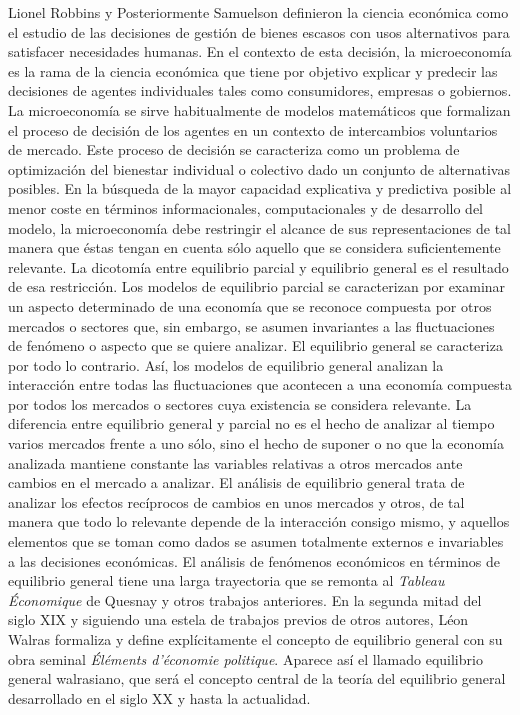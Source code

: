 \documentclass{nuevotema}
\begin{document}
\ideaclave

Lionel Robbins y Posteriormente Samuelson definieron la ciencia económica como el estudio de las decisiones de gestión de bienes escasos con usos alternativos para satisfacer necesidades humanas. En el contexto de esta decisión, la microeconomía es la rama de la ciencia económica que tiene por objetivo explicar y predecir las decisiones de agentes individuales tales como consumidores, empresas o gobiernos. La microeconomía se sirve habitualmente de modelos matemáticos que formalizan el proceso de decisión de los agentes en un contexto de intercambios voluntarios de mercado. Este proceso de decisión se caracteriza como un problema de optimización del bienestar individual o colectivo dado un conjunto de alternativas posibles. En la búsqueda de la mayor capacidad explicativa y predictiva posible al menor coste en términos informacionales, computacionales y de desarrollo del modelo, la microeconomía debe restringir el alcance de sus representaciones de tal manera que éstas tengan en cuenta sólo aquello que se considera suficientemente relevante. La dicotomía entre equilibrio parcial y equilibrio general es el resultado de esa restricción. Los modelos de equilibrio parcial se caracterizan por examinar un aspecto determinado de una economía que se reconoce compuesta por otros mercados o sectores que, sin embargo, se asumen invariantes a las fluctuaciones de fenómeno o aspecto que se quiere analizar. El equilibrio general se caracteriza por todo lo contrario. Así, los modelos de equilibrio general analizan la interacción entre todas las fluctuaciones que acontecen a una economía compuesta por todos los mercados o sectores cuya existencia se considera relevante. La diferencia entre equilibrio general y parcial no es el hecho de analizar al tiempo varios mercados frente a uno sólo, sino el hecho de suponer o no que la economía analizada mantiene constante las variables relativas a otros mercados ante cambios en el mercado a analizar. El análisis de equilibrio general trata de analizar los efectos recíprocos de cambios en unos mercados y otros, de tal manera que todo lo relevante depende de la interacción consigo mismo, y aquellos elementos que se toman como dados se asumen totalmente externos e invariables a las decisiones económicas. El análisis de fenómenos económicos en términos de equilibrio general tiene una larga trayectoria que se remonta al \textit{Tableau Économique} de Quesnay y otros trabajos anteriores. En la segunda mitad del siglo XIX y siguiendo una estela de trabajos previos de otros autores, Léon Walras formaliza y define explícitamente el concepto de equilibrio general con su obra seminal \textit{Éléments d'économie politique}. Aparece así el llamado equilibrio general walrasiano, que será el concepto central de la teoría del equilibrio general desarrollado en el siglo XX y hasta la actualidad.
\end{document}
